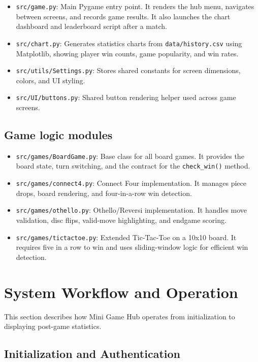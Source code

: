 \documentclass[12pt,a4paper]{article}
\begin{document}
\begin{itemize}
    \item \texttt{src/game.py}: Main Pygame entry point. It renders the hub menu, navigates between screens, and records game results. It also launches the chart dashboard and leaderboard script after a match.
    \item \texttt{src/chart.py}: Generates statistics charts from \texttt{data/history.csv} using Matplotlib, showing player win counts, game popularity, and win rates.
    \item \texttt{src/utils/Settings.py}: Stores shared constants for screen dimensions, colors, and UI styling.
    \item \texttt{src/UI/buttons.py}: Shared button rendering helper used across game screens.
\end{itemize}

\subsection{Game logic modules}

\begin{itemize}
    \item \texttt{src/games/BoardGame.py}: Base class for all board games. It provides the board state, turn switching, and the contract for the \texttt{check\_win()} method.
    \item \texttt{src/games/connect4.py}: Connect Four implementation. It manages piece drops, board rendering, and four-in-a-row win detection.
    \item \texttt{src/games/othello.py}: Othello/Reversi implementation. It handles move validation, disc flips, valid-move highlighting, and endgame scoring.
    \item \texttt{src/games/tictactoe.py}: Extended Tic-Tac-Toe on a 10x10 board. It requires five in a row to win and uses sliding-window logic for efficient win detection.
\end{itemize}

\section{System Workflow and Operation}

This section describes how Mini Game Hub operates from initialization to displaying post-game statistics.

\subsection{Initialization and Authentication}
\end{document}
